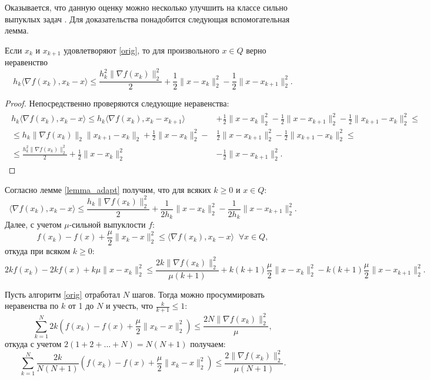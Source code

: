 Оказывается, что данную оценку можно несколько улучшить на классе сильно выпуклых задач \cite{Stonyakin_2021}. Для доказательства понадобится следующая вспомогательная лемма. 
\begin{lemma}\label{lemma_adapt}
Если $x_k$ и $x_{k+1}$ удовлетворяют \eqref{orig}, то для произвольного $x \in Q$ верно неравенство
$$
    h_k \langle \nabla f(x_k), x_k - x \rangle \leq \frac{h^2_k \|\nabla f(x_k)\|^2_2}{2} + \frac{1}{2}\| x - x_k\|^2_2 - \frac{1}{2}\| x -x_{k+1}\|^2_2.
$$
\end{lemma}
\begin{proof}
Непосредственно проверяются следующие неравенства:
\begin{gather*}
  \begin{aligned}
    h_k \langle \nabla f(x_k), x_k - x \rangle \leq h_k \langle \nabla f(x_k), x_k - x_{k+1} \rangle & + \frac{1}{2}\| x - x_k\|^2_2 -  \frac{1}{2}\| x - x_{k+1}\|^2_2 - \frac{1}{2}\| x_{k+1} - x_k\|^2_2 \leq \\
    \leq h_k \|\nabla f(x_k)\|_2 \| x_{k+1} - x_{k} \|_2 + \frac{1}{2}\| x - x_k\|^2_2 -  &\frac{1}{2}\| x -x_{k+1}\|^2_2 - \frac{1}{2}\| x_{k+1} -x_k\|^2_2 \leq \\ \leq \frac{h^2_k \|\nabla f(x_k)\|^2_2}{2} + \frac{1}{2}\| x - x_k\|^2_2& -  \frac{1}{2}\| x - x_{k+1}\|^2_2.
  \end{aligned}
\end{gather*}
\end{proof}

Согласно лемме \ref{lemma_adapt} получим, что для всяких $k \geq 0$ и $x \in Q$: 
$$
    \langle \nabla f(x_k), x_k - x \rangle \leq \frac{h_k \|\nabla f(x_k)\|^2_2}{2} + \frac{1}{2 h_k}\| x - x_k\|^2_2 - \frac{1}{2 h_k}\| x -x_{k+1}\|^2_2.
$$
Далее, с учетом $\mu$-сильной выпуклости $f$:
$$
    f(x_k) - f(x)  + \frac{\mu}{2}\|x_k - x \|^2_2 \leq \langle \nabla f(x_k), x_k - x \rangle \;\; \forall x \in Q,
$$
откуда при всяком $k \geq 0$:
$$
    2k f(x_k) - 2k f(x) + k\mu\|x - x_k \|^2_2 \leq \frac{2k\|\nabla f(x_k)\|^2_2}{\mu(k+1)} + k(k+1)\frac{\mu}{2}\|x - x_k\|^2_2 - k(k+1)\frac{\mu}{2}\|x - x_{k+1}\|^2_2.
$$

Пусть алгоритм \eqref{orig} отработал $N$ шагов. Тогда можно просуммировать неравенства по $k$ от 1 до $N$ и учесть, что $\frac{k}{k+1} \leq 1$:
$$
    \sum_{k=1}^{N} 2k(f(x_k) - f(x) + \frac{\mu}{2} \| x_k - x \|^2_2) \leq \frac{2N\|\nabla f(x_k)\|^2_2}{\mu},
$$
откуда с учетом $2(1 + 2 +...+ N) = N(N + 1)$ получаем:
$$
    \sum_{k=1}^{N} \frac{2k}{N(N + 1)} (f(x_k) - f(x) + \frac{\mu}{2} \| x_k - x \|^2_2) \leq \frac{2\|\nabla f(x_k)\|^2_2}{\mu(N + 1)}.
$$

